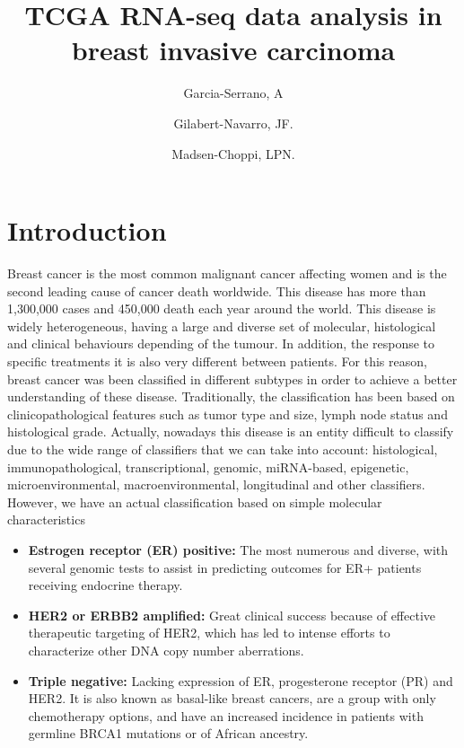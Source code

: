 \documentclass[9pt,twocolumn,twoside]{gsajnl}
\title{TCGA RNA-seq data analysis in breast invasive carcinoma}
\author[$\ast$]{Garcia-Serrano, A}
\author[$\ast$,1]{Gilabert-Navarro, JF.}
\author[$\ast$]{Madsen-Choppi, LPN.}
\affil[$\ast$]{Universitat Pompeu Fabra}
\begin{document}
\maketitle
\thispagestyle{firststyle}
\marginmark
\firstpagefootnote
{}
\vspace{-11pt}%

\section*{Introduction}
Breast cancer is the most common malignant cancer affecting women and is the second leading cause of cancer death worldwide\citep{rosam}. This disease has more than 1,300,000 cases and 450,000 death each year around the world\citep{cangen}.
This disease is widely heterogeneous, having a large and diverse set of molecular, histological and clinical behaviours depending of the tumour\citep{rosam}. In addition, the response to specific treatments it is also very different between patients. For this reason, breast cancer was been classified in different subtypes in order to achieve a better understanding of these disease. Traditionally, the classification has been based on clinicopathological features such as tumor type and size, lymph node status and histological grade\citep{rosam}. Actually, nowadays this disease is an entity difficult to classify due to the wide range of classifiers that we can take into account: histological, immunopathological, transcriptional, genomic, miRNA-based, epigenetic, microenvironmental, macroenvironmental, longitudinal and other classifiers\citep{breast}. However, we have an actual classification based on simple molecular characteristics\citep{cangen}
\begin{itemize}
\item \textbf{Estrogen receptor (ER) positive:} The most numerous and diverse, with several genomic tests to assist in predicting outcomes for ER+ patients receiving endocrine therapy.
\item \textbf{ HER2 or ERBB2 amplified:} Great clinical success because of effective therapeutic targeting of HER2, which has led to intense efforts to characterize other DNA copy number aberrations.
\item \textbf{Triple negative:} Lacking expression of ER, progesterone receptor (PR) and HER2. It is also known as basal-like breast cancers, are a group with only chemotherapy options, and have an increased incidence in patients with germline BRCA1 mutations or of African ancestry.
\end{itemize}
\end{document}
